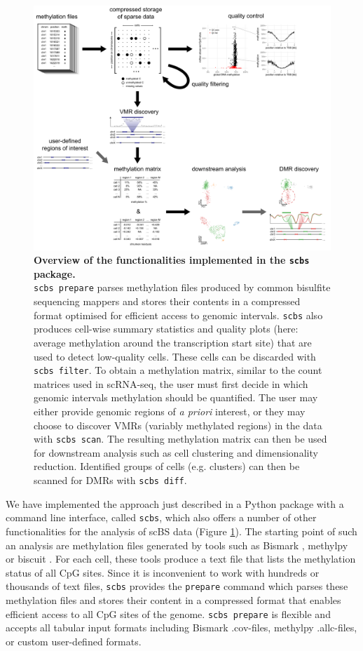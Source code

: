 \documentclass[twocolumn,10pt]{article}
\begin{document}
\begin{figure}[t]
    \begin{center}
        \includegraphics[width=.8\textwidth]{figures/Fig_workflow.png}
    \end{center}
    \caption{\small \textbf{Overview of the functionalities implemented in the \texttt{scbs} package.}\\
        \texttt{scbs prepare} parses methylation files produced by common bisulfite sequencing mappers and stores their contents in a compressed format optimised for efficient access to genomic intervals.
        \texttt{scbs} also produces cell-wise summary statistics and quality plots (here: average methylation around the transcription start site) that are used to detect low-quality cells.
        These cells can be discarded with \texttt{scbs filter}.
        To obtain a methylation matrix, similar to the count matrices used in scRNA-seq, the user must first decide in which genomic intervals methylation should be quantified.
        The user may either provide genomic regions of \emph{a priori} interest, or they may choose to discover VMRs (variably methylated regions) in the data with \texttt{scbs scan}.
        The resulting methylation matrix can then be used for downstream analysis such as cell clustering and dimensionality reduction.
        Identified groups of cells (e.g. clusters) can then be scanned for DMRs with \texttt{scbs diff}.
    }
    \label{fig:workflow}
\end{figure}

We have implemented the approach just described in a Python package with a command line interface, called \texttt{scbs}, which also offers a number of other functionalities for the analysis of scBS data (Figure \ref{fig:workflow}).
The starting point of such an analysis are methylation files generated by tools such as Bismark \citep{bismark}, methylpy \citep{methylpy} or biscuit \citep{biscuit}.
For each cell, these tools produce a text file that lists the methylation status of all CpG sites.
Since it is inconvenient to work with hundreds or thousands of text files, \texttt{scbs} provides the \texttt{prepare} command which parses these methylation files and stores their content in a compressed format that enables efficient access to all CpG sites of the genome.
\texttt{scbs prepare} is flexible and accepts all tabular input formats including Bismark .cov-files, methylpy .allc-files, or custom user-defined formats.
\end{document}
